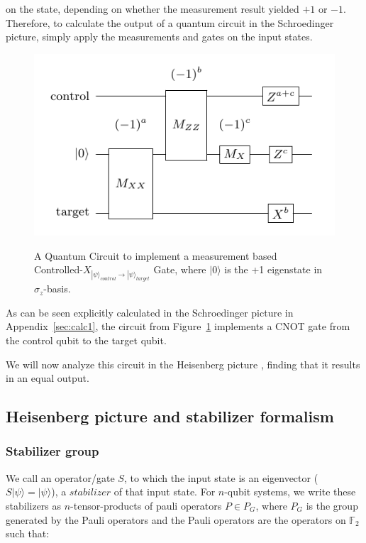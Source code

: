 on the state, depending on whether the measurement result yielded $+1$ or $-1$.
Therefore, to calculate the output of a quantum circuit in the Schroedinger
picture, simply apply the measurements and gates on the input states.
\begin{figure}[h!]
	\begin{center}
	\captionsetup{justification=centering,margin=2cm}
	\includegraphics[scale=0.4]{img/figures/cnotMeasureCircuit.png}\\
	\caption{A Quantum Circuit to implement a measurement based\\
		Controlled-$X_{|\psi\rangle_{control}\rightarrow |\psi\rangle_{target}}$ Gate,
		where $|0\rangle$ is the +1 eigenstate in $\sigma_{z}$-basis.}
	\label{fig:circuit1}
	\end{center}
\end{figure}
As can be seen explicitly calculated in the Schroedinger 
picture in Appendix~\ref{sec:calc1}, the circuit from Figure~\ref{fig:circuit1}
implements a CNOT gate from the control qubit to the target qubit.

We will now analyze this circuit in the Heisenberg picture \cite{gottesman},
finding that it results in an equal output.

\subsection{Heisenberg picture and stabilizer formalism}
\subsubsection{Stabilizer group}
We call an operator/gate $S$, to which the input state is an
eigenvector ($S|\psi\rangle=|\psi\rangle$), a $stabilizer$ of that input state. 
For $n$-qubit systems, we write these stabilizers as $n$-tensor-products 
of pauli operators $P \in P_{G}$,
where $P_{G}$ is the group generated by the Pauli operators and
the Pauli operators are the operators on $\mathbb{F}_{2}$ such that:

